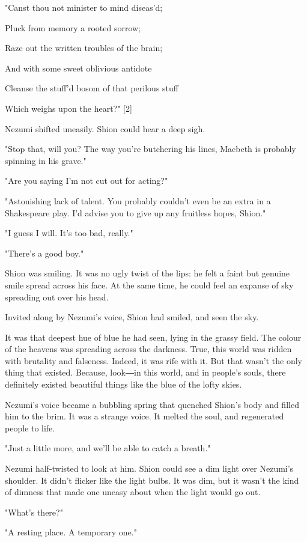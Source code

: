 "Canst thou not minister to mind diseas'd;

Pluck from memory a rooted sorrow;

Raze out the written troubles of the brain;

And with some sweet oblivious antidote

Cleanse the stuff'd bosom of that perilous stuff

Which weighs upon the heart?" {[}2{]}

Nezumi shifted uneasily. Shion could hear a deep sigh.

"Stop that, will you? The way you're butchering his lines, Macbeth is
probably spinning in his grave."

"Are you saying I'm not cut out for acting?"

"Astonishing lack of talent. You probably couldn't even be an extra in a
Shakespeare play. I'd advise you to give up any fruitless hopes, Shion."

"I guess I will. It's too bad, really."

"There's a good boy."

Shion was smiling. It was no ugly twist of the lips: he felt a faint but
genuine smile spread across his face. At the same time, he could feel an
expanse of sky spreading out over his head.

Invited along by Nezumi's voice, Shion had smiled, and seen the sky.

It was that deepest hue of blue he had seen, lying in the grassy field.
The colour of the heavens was spreading across the darkness. True, this
world was ridden with brutality and falseness. Indeed, it was rife with
it. But that wasn't the only thing that existed. Because, look―in this
world, and in people's souls, there definitely existed beautiful things
like the blue of the lofty skies.

Nezumi's voice became a bubbling spring that quenched Shion's body and
filled him to the brim. It was a strange voice. It melted the soul, and
regenerated people to life.

"Just a little more, and we'll be able to catch a breath."

Nezumi half-twisted to look at him. Shion could see a dim light over
Nezumi's shoulder. It didn't flicker like the light bulbs. It was dim,
but it wasn't the kind of dimness that made one uneasy about when the
light would go out.

"What's there?"

"A resting place. A temporary one."

